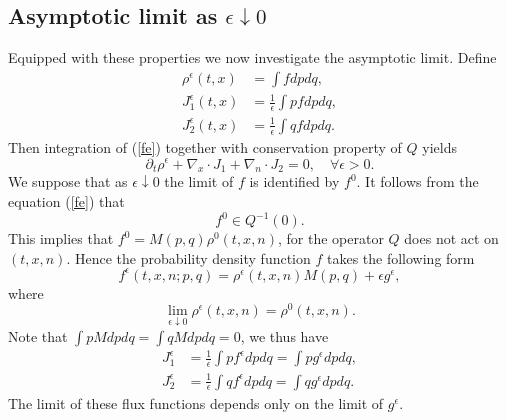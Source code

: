 \documentclass[reqno]{amsart}
\numberwithin{equation}{section}
\theoremstyle{definition}
\theoremstyle{remark}
\begin{document}
\subsection{Asymptotic limit as $\epsilon \downarrow 0$}
Equipped with these properties we now investigate the asymptotic limit.
Define
\begin{align*}
\rho^\epsilon(t, x)& =\int f dpdq,\\
J_1^\epsilon(t, x)& =\frac{1}{\epsilon}\int p f dpdq,\\
J_2^\epsilon(t, x)& =\frac{1}{\epsilon}\int q f dpdq.
\end{align*}
Then integration of (\ref{fe}) together with conservation property
of $Q$ yields
\begin{equation}\label{con}
    \partial_t \rho^\epsilon +\nabla_x\cdot J_1+\nabla_n \cdot J_2=0,
    \quad \forall \epsilon >0.
\end{equation}
We suppose that as $\epsilon \downarrow 0$ the limit of $f$ is identified  by
$f^0$. It follows from the equation (\ref{fe}) that
$$
f^0\in Q^{-1}(0).
$$
This implies that $f^0=M(p, q)\rho^0(t, x, n)$,  for the operator
$Q$ does not act on $(t, x, n)$.  Hence the probability density
function $f$ takes the following form
$$
f^\epsilon(t, x, n; p, q)=\rho^\epsilon(t, x, n)M(p, q)+\epsilon
g^\epsilon,
$$
where
$$
\lim_{\epsilon \downarrow 0} \rho^\epsilon(t, x, n)=\rho^0(t, x, n).
$$
Note that $\int pMdpdq=\int qMdpdq=0$, we thus have
\begin{align}
J_1^\epsilon &=\frac{1}{\epsilon}\int pf^\epsilon dpdq=\int
pg^\epsilon dpdq,\\
J_2^\epsilon &=\frac{1}{\epsilon}\int q f^\epsilon dpdq=\int q
g^\epsilon dpdq.
\end{align}
The limit of these flux functions depends only on the limit of $g^\epsilon$.
\end{document}

